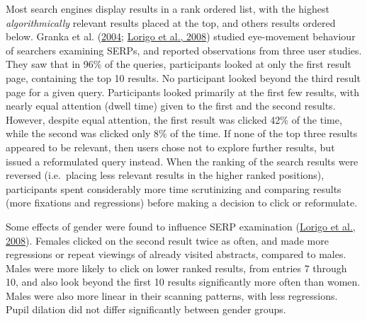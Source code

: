 \documentclass[letterpaper, nobind]{templates/ociamthesis}
\begin{document}
Most search engines display results in a rank ordered list, with the
highest \emph{algorithmically} relevant results placed at the top, and others
results ordered below. Granka et al. (\protect\hyperlink{ref-101}{2004}; \protect\hyperlink{ref-108}{Lorigo et al., 2008}) studied eye-movement behaviour of
searchers examining SERPs, and reported observations from three user
studies. They saw that in 96\% of the queries, participants looked at
only the first result page, containing the top 10 results. No
participant looked beyond the third result page for a given query.
Participants looked primarily at the first few results, with nearly
equal attention (dwell time) given to the first and the second results.
However, despite equal attention, the first result was clicked 42\% of
the time, while the second was clicked only 8\% of the time. If none of
the top three results appeared to be relevant, then users chose not to
explore further results, but issued a reformulated query instead. When
the ranking of the search results were reversed (i.e.~placing less
relevant results in the higher ranked positions), participants spent
considerably more time scrutinizing and comparing results (more
fixations and regressions) before making a decision to click or
reformulate.

Some effects of gender were found to influence SERP examination (\protect\hyperlink{ref-108}{Lorigo et al., 2008}).
Females clicked on the second result twice as often, and made more
regressions or repeat viewings of already visited abstracts, compared to
males. Males were more likely to click on lower ranked results, from
entries 7 through 10, and also look beyond the first 10 results
significantly more often than women. Males were also more linear in
their scanning patterns, with less regressions. Pupil dilation did not
differ significantly between gender groups.
\end{document}
